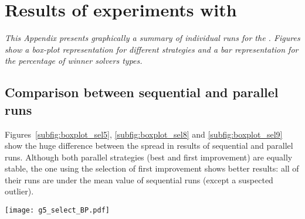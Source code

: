 \chapter{Results of experiments with \sgp}
\label{app:sgp}
\textit{This Appendix presents graphically a summary of individual runs for the \sgp. Figures show a \textit{box-plot} representation for different strategies and a bar representation for the percentage of winner solvers types.}

\vspace{2ex}\vfill
\minitoc
\newpage

\section{Comparison between sequential and parallel runs}

%

\begin{minipage}[c]{0.50\textwidth}
Figures~\ref{subfig:boxplot_sel5}, \ref{subfig:boxplot_sel8} and \ref{subfig:boxplot_sel9} show the huge difference between the spread in results of sequential and parallel runs. Although both parallel strategies (best and first improvement) are equally stable, the one using the selection \om{} of first improvement shows better results: all of their runs are under the mean value of sequential runs (except a suspected outlier).
\end{minipage}\hspace{0.05\textwidth}
\begin{minipage}[c]{0.40\textwidth}
\centering
\texttt{[image: g5\_select\_BP.pdf]}
\label{subfig:boxplot_sel5}
\end{minipage}

